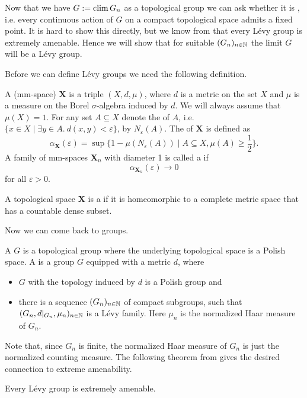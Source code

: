 Now that we have $G:=\operatorname{clim} G_n$ as a topological group we can ask whether it is , i.e. every continuous action of $G$ on a compact topological space admits a fixed point. It is hard to show this directly, but we know from \cite{Levy} that every L\'evy group is extremely amenable. Hence we will show that for suitable $(G_n)_{n\in\mathbb{N}}$ the limit $G$ will be a L\'evy group.

Before we can define L\'evy groups we need the following definition.
\begin{definition}
A  (mm-space) $\boldsymbol{X}$ is a triple $(X,d,\mu)$, where $d$ is a metric on the set $X$ and $\mu$ is a measure on the Borel $\sigma$-algebra induced by $d$. We will always assume that $\mu(X)=1$. 
For any set $A\subseteq X$ denote the  of $A$, i.e. $\{x\in X\mid\exists y\in A.\  d(x,y)<\varepsilon\}$, by $N_\varepsilon(A)$.%
The  of $\boldsymbol{X}$ is defined as 
\[\alpha_{\boldsymbol{X}}(\varepsilon)=\sup\{1-\mu(N_\varepsilon(A))\mid A\subseteq X, \mu(A)\geq\frac{1}{2}\}.\]
A family of mm-spaces $\boldsymbol{X}_n$ with diameter 1 is called a  if 
\[\alpha_{\boldsymbol{X}_n}(\varepsilon)\to 0\]
for all $\varepsilon>0$.

A topological space $\boldsymbol{X}$ is a  if it is homeomorphic to a complete metric space that has a countable dense subset.
\end{definition}

Now we can come back to groups.
\begin{definition}
A  $G$ is a topological group where the underlying topological space is a Polish space. A  is a group $G$ equipped with a metric $d$, where
\begin{itemize}
\item $G$ with the topology induced by $d$ is a Polish group and
\item there is a sequence $(G_n)_{n\in\mathbb{N}}$ of compact subgroups, such that $(G_n,d|_{G_n},\mu_n)_{n\in\mathbb{N}}$ is a L\'evy family. Here $\mu_n$ is the normalized Haar measure of $G_n$.
\end{itemize}  
\end{definition}
Note that, since $G_n$ is finite, the normalized Haar measure of $G_n$ is just the normalized counting measure.
The following theorem from \cite[Theorem \textbf{4.1.3}]{Levy} %
gives the desired connection to extreme amenability.
\begin{theorem}\label{thm:LevyImpliesExAm}
Every L\'evy group is extremely amenable.
\end{theorem}

